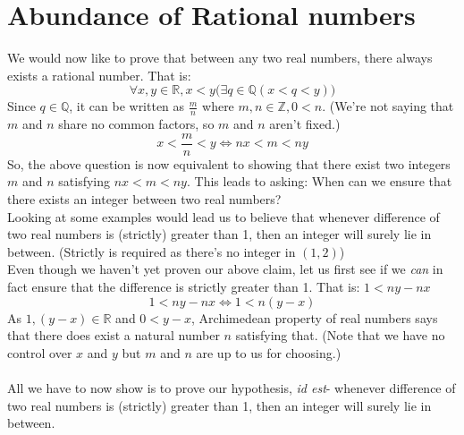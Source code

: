 \hrulefill


\hrulefill
\section{Abundance of Rational numbers}\label{sec:abundanceofq}
We would now like to prove that between any two real numbers, there always exists a rational number. That is:
$$\forall x, y \in\mathbb{R}, x < y\big(\exists q \in\mathbb{Q}(x < q < y)\big)$$
Since $q \in \mathbb{Q}$, it can be written as $\frac{m}{n}$ where $m, n \in \mathbb{Z}, 0 < n$. (We're not saying that $m$ and $n$ share no common factors, so $m$ and $n$ aren't fixed.)\\
$$x < \dfrac{m}{n} < y \iff nx < m < ny$$
So, the above question is now equivalent to showing that there exist two integers $m$ and $n$ satisfying $nx < m < ny$. This leads to asking: When can we ensure that there exists an integer between two real numbers?\\
Looking at some examples would lead us to believe that whenever difference of two real numbers is (strictly) greater than 1, then an integer will surely lie in between. (Strictly is required as there's no integer in $(1, 2)$)\\
Even though we haven't yet proven our above claim, let us first see if we \textit{can} in fact ensure that the difference is strictly greater than 1. That is: $1 < ny - nx$
$$1 < ny - nx \iff 1 < n(y-x)$$
As $1, (y-x) \in \mathbb{R}$ and $0 < y-x$, Archimedean property of real numbers says that there does exist a natural number $n$ satisfying that. (Note that we have no control over $x$ and $y$ but $m$ and $n$ are up to us for choosing.)\\~\\
All we have to now show is to prove our hypothesis, \textit{id est}- whenever difference of two real numbers is (strictly) greater than 1, then an integer will surely lie in between.

\hrulefill


\hrulefill